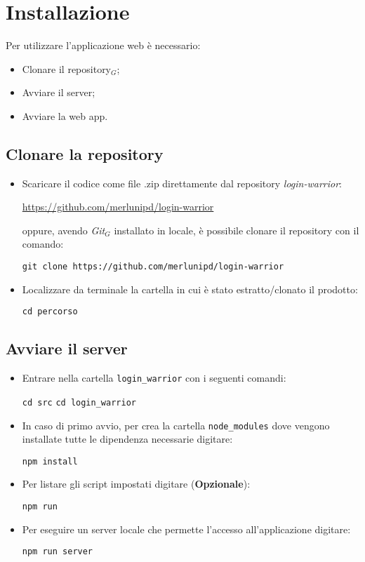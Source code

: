 \chapter{Installazione}
Per utilizzare l'applicazione web è necessario:
\begin{itemize}
  \item Clonare il repository$_G$;
  \item Avviare il server;
  \item Avviare la web app.
\end{itemize}
\section{Clonare la repository}
\begin{itemize}
  \item Scaricare il codice come file .zip direttamente dal repository \textit{login-warrior}:
  \begin{center}
    \url{https://github.com/merlunipd/login-warrior}
  \end{center}
  oppure, avendo \textit{Git}$_G$ installato in locale, è possibile clonare il repository con il comando:
  \begin{center}
    \texttt{git clone https://github.com/merlunipd/login-warrior}
  \end{center}
  \item Localizzare da terminale la cartella in cui è stato estratto/clonato il prodotto:
  \begin{center}
    \texttt{cd percorso\LoginWarrior}
  \end{center}
\end{itemize}

\section{Avviare il server}
\begin{itemize}
  \item Entrare nella cartella \texttt{login_warrior} con i seguenti comandi:
  \begin{center}
    \texttt{cd src}
    \texttt{cd login_warrior}
  \end{center}
  \item In caso di primo avvio, per crea la cartella \texttt{node_modules} dove vengono installate tutte le dipendenza necessarie digitare:
  \begin{center}
    \texttt{npm install}
  \end{center}
  \item Per listare gli script impostati digitare (\textbf{Opzionale}):
  \begin{center}
    \texttt{npm run}
  \end{center}
  \item Per eseguire un server locale che permette l'accesso all'applicazione digitare:
  \begin{center}
    \texttt{npm run server}
  \end{center}
\end{itemize}

